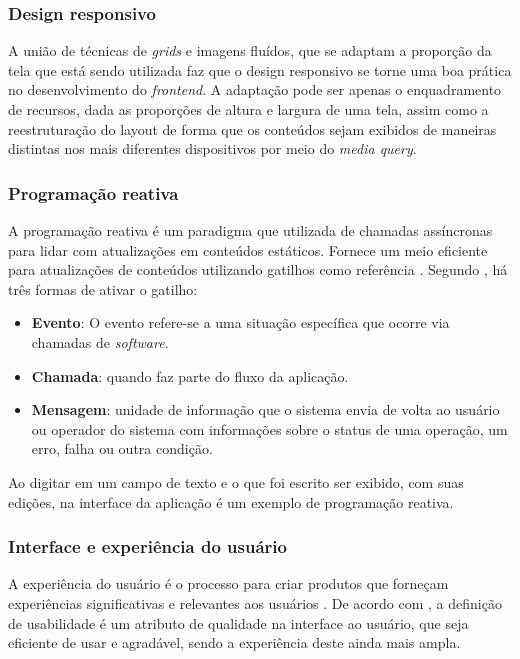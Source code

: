 \subsubsection{Design responsivo}
A união de técnicas de \textit{grids} e imagens fluídos, que se adaptam a proporção da tela que está sendo utilizada faz que o design responsivo se torne uma boa prática no desenvolvimento do \textit{frontend}. A adaptação pode ser apenas o enquadramento de recursos, dada as proporções de altura e largura de uma tela, assim como a reestruturação do layout de forma que os conteúdos sejam exibidos de maneiras distintas nos mais diferentes dispositivos por meio do \textit{media query}. \cite{MOZILA}

\subsubsection{Programação reativa}
A programação reativa é um paradigma que utilizada de chamadas assíncronas para lidar com atualizações em conteúdos estáticos. Fornece um meio eficiente para atualizações de conteúdos utilizando gatilhos como referência \cite{NOLLE}. Segundo , há três formas de ativar o gatilho:
\begin{itemize}
    \item \textbf{Evento}: O evento refere-se a uma situação específica que ocorre via chamadas de \textit{software}.
    \item \textbf{Chamada}: quando faz parte do fluxo da aplicação.
    \item \textbf{Mensagem}: unidade de informação que o sistema envia de volta ao usuário ou operador do sistema com informações sobre o status de uma operação, um erro, falha ou outra condição.
\end{itemize}

Ao digitar em um campo de texto e o que foi escrito ser exibido, com suas edições, na interface da aplicação é um exemplo de programação reativa.

\subsubsection{Interface e experiência do usuário}
A experiência do usuário é o processo para criar produtos que forneçam experiências significativas e relevantes aos usuários \cite{UX}. De acordo com , a definição de usabilidade é um atributo de qualidade na interface ao usuário, que seja eficiente de usar e agradável, sendo a experiência deste ainda mais ampla. 

